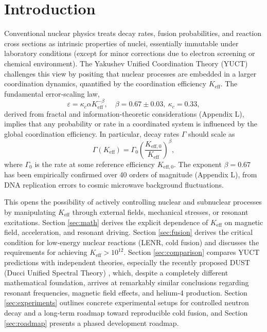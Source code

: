 \documentclass[12pt]{article}
\theoremstyle{remark}
\newcommand{\Keff}{K_{\mathrm{eff}}}
\newcommand{\Keffzero}{K_{\mathrm{eff},0}}
\begin{document}
	\tableofcontents
	\newpage
	
	\section{Introduction}
	\label{sec:intro}
	
	Conventional nuclear physics treats decay rates, fusion probabilities, and reaction cross sections as intrinsic properties of nuclei, essentially immutable under laboratory conditions (except for minor corrections due to electron screening or chemical environment). The Yakushev Unified Coordination Theory (YUCT) challenges this view by positing that nuclear processes are embedded in a larger coordination dynamics, quantified by the coordination efficiency \(\Keff\). The fundamental error‑scaling law,
	\begin{equation}
		\varepsilon = \kappa_c \alpha \Keff^{-\beta}, \quad \beta = 0.67 \pm 0.03,\ \kappa_c = 0.33,
		\label{eq:universal-scaling}
	\end{equation}
	derived from fractal and information‑theoretic considerations (Appendix L), implies that any probability or rate in a coordinated system is influenced by the global coordination efficiency. In particular, decay rates \(\Gamma\) should scale as
	\begin{equation}
		\Gamma(\Keff) = \Gamma_0 \left( \frac{\Keffzero}{\Keff} \right)^{\beta},
		\label{eq:decay-rate}
	\end{equation}
	where \(\Gamma_0\) is the rate at some reference efficiency \(\Keffzero\). The exponent \(\beta = 0.67\) has been empirically confirmed over 40 orders of magnitude (Appendix L), from DNA replication errors to cosmic microwave background fluctuations.
	
	This opens the possibility of actively controlling nuclear and subnuclear processes by manipulating \(\Keff\) through external fields, mechanical stresses, or resonant excitations. Section \ref{sec:math} derives the explicit dependence of \(\Keff\) on magnetic field, acceleration, and resonant driving. Section \ref{sec:fusion} derives the critical condition for low‑energy nuclear reactions (LENR, cold fusion) and discusses the requirements for achieving \(\Keff > 10^{12}\). Section \ref{sec:comparison} compares YUCT predictions with independent theories, especially the recently proposed DUST (Ducci Unified Spectral Theory) \cite{Ducci2025,Ducci2026a,Ducci2026b}, which, despite a completely different mathematical foundation, arrives at remarkably similar conclusions regarding resonant frequencies, magnetic field effects, and helium‑4 production. Section \ref{sec:experiments} outlines concrete experimental setups for controlled neutron decay and a long‑term roadmap toward reproducible cold fusion, and Section \ref{sec:roadmap} presents a phased development roadmap.
	
\end{document}
